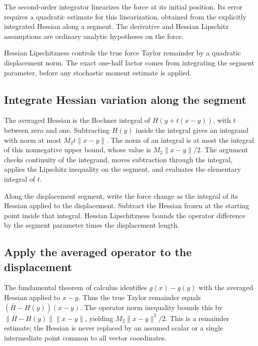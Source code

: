 \documentclass[11pt,a4paper]{report}
\begin{document}
The second-order integrator linearizes the force at its initial position. Its error requires a quadratic estimate for this linearization, obtained from the explicitly integrated Hessian along a segment. The derivative and Hessian Lipschitz assumptions are ordinary analytic hypotheses on the force.



Hessian Lipschitzness controls the true force Taylor remainder by a quadratic displacement norm. The exact one-half factor comes from integrating the segment parameter, before any stochastic moment estimate is applied.

\subsection{\texorpdfstring{Integrate Hessian variation along the segment}{Integrate Hessian variation along the segment}}
\label{report-step-KineticLangevin-HessianRemainder-lean-1}


The averaged Hessian is the Bochner integral of \(H(y+t(x-y))\), with \(t\) between zero and one. Subtracting \(H(y)\) inside the integral gives an integrand with norm at most \(M_{2}t\|x-y\|\). The norm of an integral is at most the integral of this nonnegative upper bound, whose value is \(M_{2}\|x-y\|/2\). The argument checks continuity of the integrand, moves subtraction through the integral, applies the Lipschitz inequality on the segment, and evaluates the elementary integral of \(t\).



Along the displacement segment, write the force change as the integral of its Hessian applied to the displacement. Subtract the Hessian frozen at the starting point inside that integral. Hessian Lipschitzness bounds the operator difference by the segment parameter times the displacement length.

\subsection{\texorpdfstring{Apply the averaged operator to the displacement}{Apply the averaged operator to the displacement}}
\label{report-step-KineticLangevin-HessianRemainder-lean-2}


The fundamental theorem of calculus identifies \(g(x)-g(y)\) with the averaged Hessian applied to \(x-y\). Thus the true Taylor remainder equals \((\bar H-H(y))(x-y)\). The operator norm inequality bounds this by \(\|\bar H-H(y)\|\|x-y\|\), yielding \(M_{2}\|x-y\|^{2}/2\). This is a remainder estimate; the Hessian is never replaced by an assumed scalar or a single intermediate point common to all vector coordinates.
\end{document}
